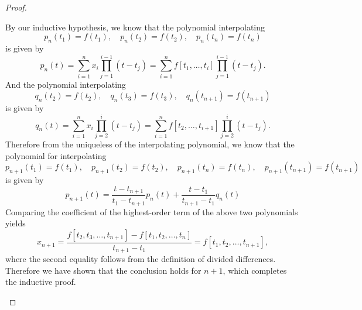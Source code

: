 \begin{proof}
\begin{itemize}
    By our inductive hypothesis, we know that
    the polynomial interpolating
    \begin{displaymath}
      p_n(t_1) = f(t_1), \quad p_n(t_2) = f(t_2), \quad p_n(t_n) = f(t_n)
    \end{displaymath}
    is given by
    \begin{displaymath}
      p_n(t) = \sum_{i=1}^nx_i\prod_{j=1}^{i-1}(t-t_j)
      = \sum_{i=1}^nf[t_1, \ldots, t_i]\prod_{j=1}^{i-1}(t-t_j).
    \end{displaymath}
    And the polynomial interpolating
    \begin{displaymath}
      q_n(t_2) = f(t_2), \quad q_n(t_3) = f(t_3), \quad q_n(t_{n+1}) = f(t_{n+1})
    \end{displaymath}
    is given by
    \begin{displaymath}
      q_n(t) = \sum_{i=1}^nx_i\prod_{j=2}^i(t-t_j)
      = \sum_{i=1}^nf[t_2, \ldots, t_{i+1}]\prod_{j=2}^i(t-t_j).
    \end{displaymath}
    Therefore from the uniqueless of the interpolating polynomial,
    we know that the polynomial for interpolating
    \begin{displaymath}
      p_{n+1}(t_1) = f(t_1), \quad p_{n+1}(t_2) = f(t_2), \quad
      p_{n+1}(t_n) = f(t_n), \quad p_{n+1}(t_{n+1}) = f(t_{n+1})
    \end{displaymath}
    is given by
    \begin{displaymath}
      p_{n+1}(t) = \frac{t-t_{n+1}}{t_1-t_{n+1}}p_n(t)
      + \frac{t-t_1}{t_{n+1}-t_1}q_n(t)
    \end{displaymath}
    Comparing the coefficient of the highest-order term of the above
    two polynomials yields
    \begin{displaymath}
      x_{n+1} = \frac{f[t_2, t_3, \ldots, t_{n+1}]-f[t_1, t_2, \ldots,
        t_n]}{t_{n+1} - t_1} = f[t_1, t_2, \ldots, t_{n+1}],
    \end{displaymath}
    where the second equality follows from the definition of divided differences.
    Therefore we have shown that the conclusion holds for $n+1$,
    which completes the inductive proof.
  \end{itemize}
\end{proof}
